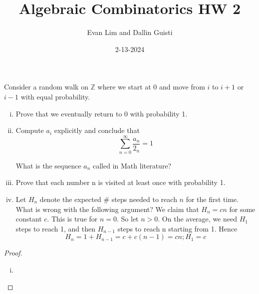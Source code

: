\documentclass[11pt]{scrartcl}
\title{Algebraic Combinatorics HW 2}
\author{Evan Lim and Dallin Guisti}
\date{2-13-2024}
\begin{document}
\maketitle
\setcounter{section}{1}
\begin{problem}
    Consider a random walk on $\mathbb{Z}$ where we start at 0 and move from $i$ to $i + 1$ or $i - 1$ with equal probability.

    \begin{enumerate}[(i)]
        \item Prove that we eventually return to 0 with probability 1.
        \item Compute $a_i$ explicitly and conclude that
        \[
            \sum_{n=0}^{\infty} \frac{a_n}{2_n} = 1
        \]

        What is the sequence ${a_n}$ called in Math literature?
        \item Prove that each number n is visited at least once with probability 1.
        \item Let $H_n$ denote the expected \# steps needed to reach $n$ for the first time. What is wrong with the
        following argument?
        We claim that $H_n = cn$ for some constant $c$. This is true for $n = 0$. So let $n > 0$. On the average, we need $H_1$ steps to reach 1, and then $H_{n-1}$ steps to reach n starting from 1. Hence
        \[
            H_n = 1 + H_{n-1} = c + c(n-1) = cn ; H_1 = c
        \]
    \end{enumerate}
\end{problem}
\begin{proof}
    \begin{enumerate}[(i)]
        \item 
    \end{enumerate}
\end{proof}
\end{document}
